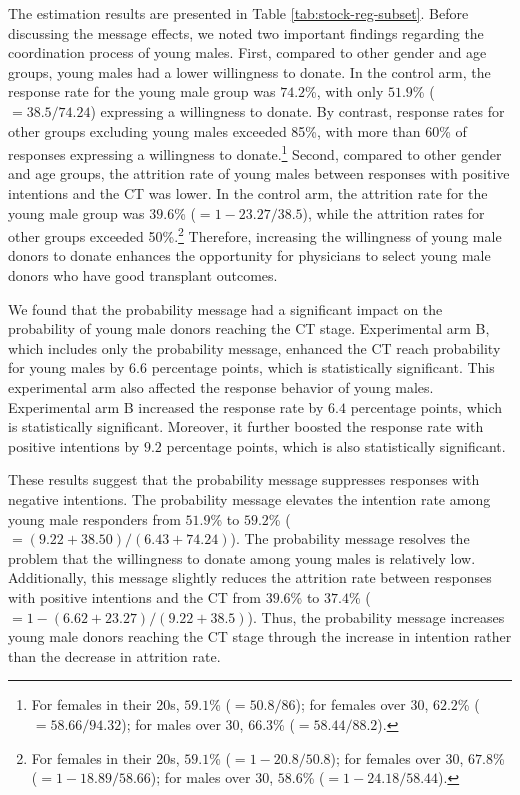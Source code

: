 \documentclass [12pt, a4paper]{article}
\begin{document}
The estimation results are presented in Table \ref{tab:stock-reg-subset}. Before discussing the message effects, we noted two important findings regarding the coordination process of young males. First, compared to other gender and age groups, young males had a lower willingness to donate. In the control arm, the response rate for the young male group was \(74.2\)\%, with only \(51.9\)\% (\(=38.5/74.24\)) expressing a willingness to donate. By contrast, response rates for other groups excluding young males exceeded 85\%, with more than 60\% of responses expressing a willingness to donate.\footnote{For females in their 20s, \(59.1\)\% (\(=50.8/86\)); for females over 30, \(62.2\)\% (\(=58.66/94.32\)); for males over 30, \(66.3\)\% (\(=58.44/88.2\)).} Second, compared to other gender and age groups, the attrition rate of young males between responses with positive intentions and the CT was lower. In the control arm, the attrition rate for the young male group was \(39.6\)\% (\(=1-23.27/38.5\)), while the attrition rates for other groups exceeded 50\%.\footnote{For females in their 20s, \(59.1\)\% (\(=1 - 20.8/50.8\)); for females over 30, \(67.8\)\% (\(=1-18.89/58.66\)); for males over 30, \(58.6\)\% (\(=1-24.18/58.44\)).} Therefore, increasing the willingness of young male donors to donate enhances the opportunity for physicians to select young male donors who have good transplant outcomes.

We found that the probability message had a significant impact on the probability of young male donors reaching the CT stage. Experimental arm B, which includes only the probability message, enhanced the CT reach probability for young males by \(6.6\) percentage points, which is statistically significant. This experimental arm also affected the response behavior of young males. Experimental arm B increased the response rate by \(6.4\) percentage points, which is statistically significant. Moreover, it further boosted the response rate with positive intentions by \(9.2\) percentage points, which is also statistically significant.

These results suggest that the probability message suppresses responses with negative intentions. The probability message elevates the intention rate among young male responders from \(51.9\)\% to \(59.2\)\% (\(=(9.22+38.50)/(6.43+74.24)\)). The probability message resolves the problem that the willingness to donate among young males is relatively low. Additionally, this message slightly reduces the attrition rate between responses with positive intentions and the CT from \(39.6\)\% to \(37.4\)\% (\(=1-(6.62+23.27)/(9.22+38.5)\)). Thus, the probability message increases young male donors reaching the CT stage through the increase in intention rather than the decrease in attrition rate.
\end{document}
